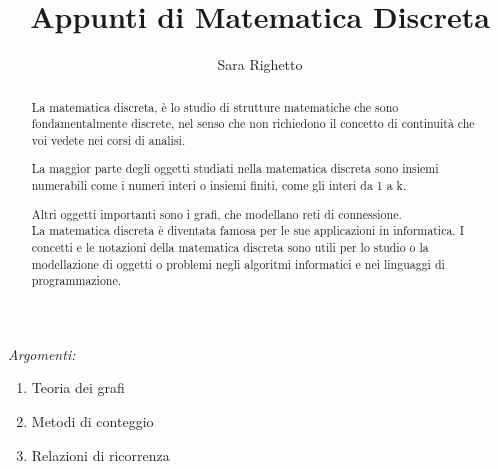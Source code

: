 \documentclass[12pt,a4paper]{article}
\begin{document}
    \author{Sara Righetto}
    \title{Appunti di Matematica Discreta}

    \maketitle

    \newpage
    \tableofcontents %

    \newpage

    \begin{abstract} 
        La matematica discreta, è lo studio di strutture matematiche che sono fondamentalmente discrete, nel senso che non
    richiedono il concetto di continuità che voi vedete nei corsi di analisi. \par
    La maggior parte degli oggetti studiati nella matematica discreta sono insiemi numerabili come i numeri interi o
    insiemi finiti, come gli interi da 1 a k. \par
    Altri oggetti importanti sono i grafi, che modellano reti di connessione. \\

        La matematica discreta è diventata famosa per le sue applicazioni in informatica. I concetti e le notazioni della matematica discreta sono utili per lo studio o la modellazione di oggetti o problemi negli algoritmi informatici e nei linguaggi di programmazione.
    \end{abstract}

\begin{center}
    \textit{Argomenti:}
    \begin{enumerate}
        \item Teoria dei grafi 
        \item Metodi di conteggio
        \item Relazioni di ricorrenza
    \end{enumerate}
\end{center}

    \newpage













\end{document}
